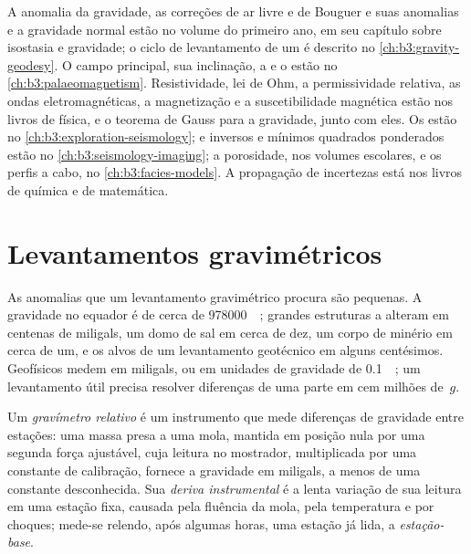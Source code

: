 \begin{recall}
A anomalia da gravidade, as correções de ar livre e de Bouguer e suas anomalias
e a gravidade normal estão no volume do primeiro ano, em seu capítulo sobre
isostasia e gravidade; o ciclo de levantamento de um  é
descrito no \cref{ch:b3:gravity-geodesy}. O campo principal, sua inclinação, a
 e o  estão
no \cref{ch:b3:palaeomagnetism}. Resistividade, lei de Ohm, a permissividade
relativa, as ondas eletromagnéticas, a magnetização e a
suscetibilidade magnética estão nos livros de física, e o teorema de Gauss para
a gravidade, junto com eles. Os  estão no
\cref{ch:b3:exploration-seismology};  e inversos e mínimos
quadrados ponderados estão no \cref{ch:b3:seismology-imaging}; a porosidade, nos
volumes escolares, e os perfis a cabo, no \cref{ch:b3:facies-models}. A
propagação de incertezas está nos livros de química e de matemática.
\end{recall}

\section{Levantamentos gravimétricos}\label{sec:b3:field-lab-methods-3:gravity}

As anomalias que um levantamento gravimétrico procura são pequenas. A gravidade no
equador é de cerca de \qty{978000}{\milli\gal}; grandes estruturas a alteram
em centenas de miligals, um domo de sal em cerca de dez, um corpo de minério em
cerca de um, e os alvos de um levantamento geotécnico em alguns
centésimos. Geofísicos medem em
miligals, ou em unidades de gravidade de \qty{0.1}{\milli\gal}; um levantamento
útil precisa resolver diferenças de uma parte em cem milhões de~$g$.

\begin{definition}\label{def:b3:field-lab-methods-3:gravimeter}
Um \emph{gravímetro relativo} é um
instrumento que mede diferenças de gravidade entre estações: uma massa presa a
uma mola, mantida em posição nula por uma segunda força ajustável, cuja
leitura no mostrador, multiplicada por uma constante de calibração, fornece a gravidade
em miligals, a menos de uma constante desconhecida. Sua \emph{deriva
instrumental} é a lenta variação de sua leitura em uma
estação fixa, causada pela fluência da mola, pela temperatura e por choques;
mede-se relendo, após algumas horas, uma
estação já lida, a \emph{estação-base}.
\end{definition}

